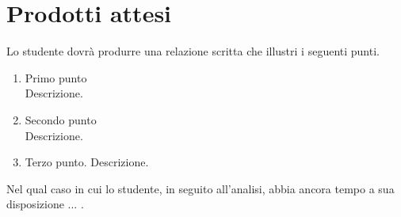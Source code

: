 
\section{Prodotti attesi}
	Lo studente dovrà produrre una relazione scritta che illustri i seguenti punti.
	\begin{enumerate}
	    \item Primo punto \\
	    Descrizione. 
	    
	    \item Secondo punto \\
	    Descrizione.
	    
	    \item Terzo punto.
	    Descrizione.
	\end{enumerate}
	
	Nel qual caso in cui lo studente, in seguito all'analisi, abbia ancora tempo a sua disposizione ... .
